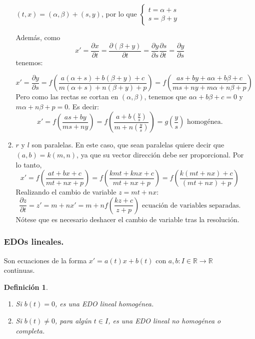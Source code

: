 \documentclass{article}
\theoremstyle{theorem-style}  %
\theoremstyle{definition-style}
\newtheorem{definition}{Definición}[section]
\theoremstyle{example-style}
\begin{document}
\begin{enumerate}[\quad i)]
\begin{enumerate}
		$ (t,x) = (\alpha,\beta)+(s,y) $, por lo que $ \begin{cases}
		t=\alpha+s\\
		s=\beta+y
		\end{cases} $
		
		Además, como \[  x'=\frac{\partial x}{\partial t}=\frac{\partial (\beta+y)}{\partial t}=\frac{\partial y}{\partial s}\frac{\partial s}{\partial t}=\frac{\partial y}{\partial s}   \]tenemos:
		
		\[  x'=\frac{\partial y}{\partial s}= f(\frac{a(\alpha+s)+b(\beta+y)+c}{m(\alpha+s)+n(\beta+y)+p})= f(\frac{as+by+a\alpha+b\beta+c}{ms+ny+m\alpha+n\beta+p})  \]
		Pero como las rectas se cortan en $ (\alpha, \beta) $, tenemos que $ a\alpha+b\beta+c=0 $ y $ m\alpha+n\beta+p=0 $. Es decir:
		\[ x'=f(\frac{as+by}{ms+ny})=f(\frac{a+b(\frac{y}{s})}{m+n(\frac{y}{s})})=g(\frac{y}{s}) \text{ homogénea.}\]
		\item $ r $ y $ l $ son paralelas. En este caso, que sean paralelas quiere decir que $ (a,b)=k(m,n) $, ya que su vector dirección debe ser proporcional. Por lo tanto,
		\[ x'=f(\frac{at+bx+c}{mt+nx+p})=f(\frac{kmt+knx+c}{mt+nx+p})=f(\frac{k(mt+nx)+c}{(mt+nx)+p})\]
		Realizando el cambio de variable $ z=mt+nx $:
		\[ \frac{\partial z}{\partial t}=z'=m+nx'=m+nf(\frac{kz+c}{z+p}) \text{ ecuación de variables separadas.} \]
		Nótese que es necesario deshacer el cambio de variable tras la resolución.
	\end{enumerate}
\subsubsection{EDOs lineales.}
Son ecuaciones de la forma $ x'=a(t)x+b(t) $ con $ a,b: I\in\mathbb{R}\longrightarrow \mathbb{R} $ continuas.
\begin{definition}\ 
	\begin{enumerate}[\quad i)]
		\item Si $ b(t)=0 $, es una \emph{EDO lineal homogénea}.
		\item Si $ b(t)\neq 0 $, para algún $ t\in I $, es una \emph{EDO lineal no homogénea o completa}.
	\end{enumerate}
\end{definition}

\end{enumerate}
\end{document}
